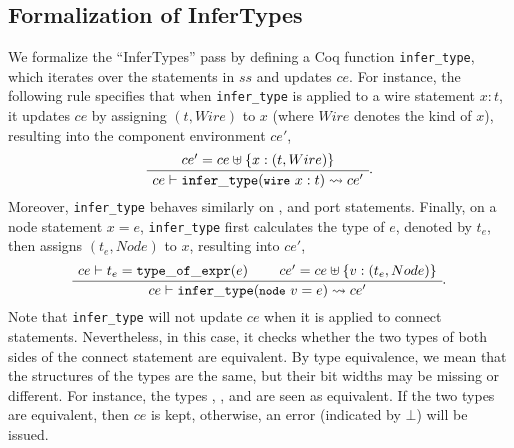 \subsection{Formalization of InferTypes}
We formalize the ``InferTypes'' pass by defining a Coq function {\tt infer\_type}, which iterates over the statements in $ss$ and updates $ce$. 
For instance, the following rule specifies that when {\tt infer\_type} is applied to a wire statement  $x: t$, it updates $ce$ by assigning $(t, Wire)$ to $x$ (where $Wire$ denotes the kind of $x$), resulting into the component environment $ce'$,
  \begin{gather}
    \infer[]
    {\seqq{ce \vdash {\tt infer\_type} (\mbox{\prettyll{wire} } x: t) \rightsquigarrow ce'}}
    {\seqq{ce'= ce \uplus \{x : (t, Wire)\}}}.
    \end{gather}
Moreover, {\tt infer\_type} behaves similarly on ,  and  port statements. Finally, on a node statement  $x = e$, {\tt infer\_type} first calculates the type of $e$, denoted by $t_e$, then assigns $(t_e, Node)$ to $x$, resulting into $ce'$,
% 
\begin{gather}
    \inferii[]
    {\seqq{ce \vdash {\tt infer\_type} (\mbox{\prettyll{node} } v = e) \rightsquigarrow ce'}}
    {\seqq{ce \vdash t_e={\tt type\_of\_expr}(e)}} {\seqq{ce' = ce \uplus \{v : (t_e, Node)\}}}.
    \end{gather}
Note that {\tt infer\_type} will not update $ce$ when it is applied to connect statements. Nevertheless, in this case, it checks whether the two types of both sides of the connect statement are equivalent. By type equivalence, we mean that the structures of the types are the same, but their bit widths may be missing or different. For instance, the types , , and  are seen as equivalent. 
If the two types are equivalent, then $ce$ is kept, otherwise, an error (indicated by $\bot$) will be issued. 
